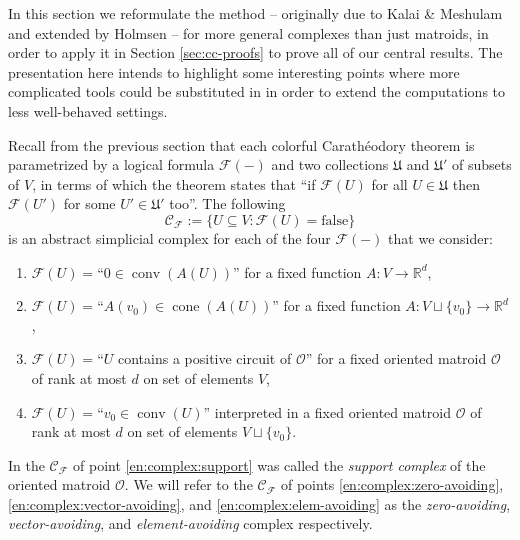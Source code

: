 \documentclass[a4paper,11pt,reqno, english]{amsart}
\theoremstyle{definition}
\theoremstyle{remark}
\newcommand\R{\mathbb R}
\DeclareMathOperator{\cone}{\mathrm{cone}}
\DeclareMathOperator{\conv}{\mathrm{conv}}
\begin{document}
In this section we reformulate the method -- originally due to Kalai \& Meshulam \cite{KalaiMeshulam2005} and extended by Holmsen \cite{Holmsen2016} -- for more general complexes than just matroids, in order to apply it in Section \ref{sec:cc-proofs} to prove all of our central results. The presentation here intends to highlight some interesting points where more complicated tools could be substituted in in order to extend the computations to less well-behaved settings.

Recall from the previous section that each colorful Carath\'eodory theorem is parametrized by a logical formula $\mathcal{F}(-)$ and two collections $\mathfrak{U}$ and $\mathfrak{U}'$ of subsets of $V$, in terms of which the theorem states that ``if $\mathcal{F}(U)$ for all $U\in \mathfrak{U}$ then $\mathcal{F}(U')$ for some $U'\in\mathfrak{U}'$ too''. The following
\[
    \mathscr{C}_\mathcal{F}:=\{U\subseteq V: \mathcal{F}(U)=\mathrm{false}\}
\]
is an abstract simplicial complex for each of the four $\mathcal{F}(-)$ that we consider:
\begin{enumerate}[label=\normalfont{(\arabic*)}]
    \item\label{en:complex:zero-avoiding} $\mathcal{F}(U)=$``$0\in\conv(A(U))$'' for a fixed function $A\colon V\to\R^d$,
    \item\label{en:complex:vector-avoiding} $\mathcal{F}(U)=$``$A(v_0)\in\cone(A(U))$'' for a fixed function $A\colon {V\sqcup\{v_0\}}\to\R^d$,
    \item\label{en:complex:support} $\mathcal{F}(U)=$``$U$ contains a positive circuit of $\mathscr{O}$'' for a fixed oriented matroid $\mathscr{O}$ of rank at most $d$ on set of elements $V$,
    \item\label{en:complex:elem-avoiding} $\mathcal{F}(U)=$``$v_0\in\conv(U)$'' interpreted in a fixed oriented matroid $\mathscr{O}$ of rank at most $d$ on set of elements $V\sqcup\{v_0\}$.
\end{enumerate}
In \cite{Holmsen2016} the $\mathscr{C}_\mathcal{F}$ of point \ref{en:complex:support} was called the \emph{support complex} of the oriented matroid $\mathscr{O}$. We will refer to the $\mathscr{C}_\mathcal{F}$ of points \ref{en:complex:zero-avoiding}, \ref{en:complex:vector-avoiding}, and \ref{en:complex:elem-avoiding} as the \emph{zero-avoiding}, \emph{vector-avoiding}, and \emph{element-avoiding} complex respectively.
\end{document}
